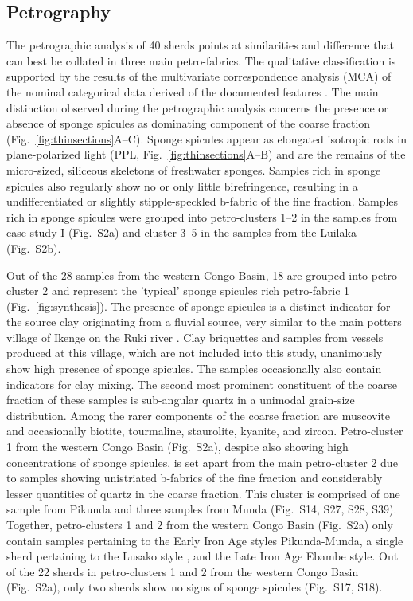 \documentclass[preprint,10pt,oneside,onecolumn,authoryear]{elsarticle}
\begin{document}
\subsection{Petrography}

The petrographic analysis of 40 sherds points at similarities and difference that can best be collated in three main petro-fabrics. The qualitative classification is supported by the results of the multivariate correspondence analysis (MCA) of the nominal categorical data derived of the documented features \citet[1336-1137 Appendix 2--3]{Cau.2004}. The main distinction observed during the petrographic analysis concerns the presence or absence of sponge spicules as dominating component of the coarse fraction (Fig.~\ref{fig:thinsections}A--C). Sponge spicules appear as elongated isotropic rods in plane-polarized light (PPL, Fig.~\ref{fig:thinsections}A--B) and are the remains of the micro-sized, siliceous skeletons of freshwater sponges. Samples rich in sponge spicules also regularly show no or only little birefringence, resulting in a undifferentiated or slightly stipple-speckled b-fabric of the fine fraction. Samples rich in sponge spicules were grouped into petro-clusters 1--2 in the samples from case study I (Fig.~S2a) and cluster 3--5 in the samples from the Luilaka (Fig.~S2b). 

Out of the 28 samples from the western Congo Basin, 18 are grouped into petro-cluster 2 and represent the 'typical' sponge spicules rich petro-fabric 1 (Fig.~\ref{fig:synthesis}). The presence of sponge spicules is a distinct indicator for the source clay originating from a fluvial source, very similar to the main potters village of Ikenge on the Ruki river \citep{Eggert.1980c}. Clay briquettes and samples from vessels produced at this village, which are not included into this study, unanimously show high presence of sponge spicules. The samples occasionally also contain indicators for clay mixing. The second most prominent constituent of the coarse fraction of these samples is sub-angular quartz in a unimodal grain-size distribution. Among the rarer components of the coarse fraction are muscovite and occasionally biotite, tourmaline, staurolite, kyanite, and zircon. Petro-cluster 1 from the western Congo Basin (Fig.~S2a), despite also showing high concentrations of sponge spicules, is set apart from the main petro-cluster 2 due to samples showing unistriated b-fabrics of the fine fraction and considerably lesser quantities of quartz in the coarse fraction. This cluster is comprised of one sample from Pikunda and three samples from Munda (Fig.~S14, S27, S28, S39). Together, petro-clusters 1 and 2 from the western Congo Basin (Fig.~S2a) only contain samples pertaining to the Early Iron Age styles Pikunda-Munda, a single sherd pertaining to the Lusako style \citep[Fig.~S21;][104--107]{Wotzka.1995}, and the Late Iron Age Ebambe style. Out of the 22 sherds in petro-clusters 1 and 2 from the western Congo Basin (Fig.~S2a), only two sherds show no signs of sponge spicules (Fig.~S17, S18). 
\end{document}
